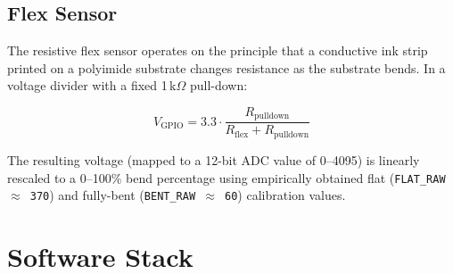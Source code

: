 \documentclass[12pt,a4paper]{report}
\newcommand{\code}[1]{\texttt{\small\color{accentviolet}#1}}
\begin{document}
\subsection{Flex Sensor}

The resistive flex sensor operates on the principle that a conductive ink strip printed on a polyimide substrate changes resistance as the substrate bends. In a voltage divider with a fixed 1\,k$\Omega$ pull-down:

\[
    V_{\text{GPIO}} = 3.3 \cdot \frac{R_{\text{pulldown}}}{R_{\text{flex}} + R_{\text{pulldown}}}
\]

The resulting voltage (mapped to a 12-bit ADC value of 0--4095) is linearly rescaled to a 0--100\% bend percentage using empirically obtained flat (\code{FLAT\_RAW $\approx$ 370}) and fully-bent (\code{BENT\_RAW $\approx$ 60}) calibration values.

\section{Software Stack}
\end{document}
